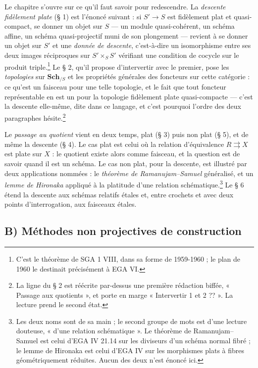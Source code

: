 \documentclass[11pt,a4paper]{article}
\begin{document}
Le chapitre s'ouvre sur ce qu'il faut savoir pour redescendre. La
\emph{descente fidèlement plate} (§ 1) est l'énoncé suivant : si $S' \to S$
est fidèlement plat et quasi-compact, se donner un objet sur $S$ — un
module quasi-cohérent, un schéma affine, un schéma quasi-projectif muni de
son plongement — revient à se donner un objet sur $S'$ et une \emph{donnée de
descente}, c'est-à-dire un isomorphisme entre ses deux images réciproques sur
$S' \times_S S'$ vérifiant une condition de cocycle sur le produit
triple.\footnote{C'est le théorème de SGA 1 VIII, dans sa forme de 1959-1960 ;
le plan de 1960 le destinait précisément à EGA VI.} Le § 2, qu'il propose
d'intervertir avec le premier, pose les \emph{topologies} sur
$\mathbf{Sch}_{/S}$ et les propriétés générales des foncteurs sur cette
catégorie : ce qu'est un faisceau pour une telle topologie, et le fait que
tout foncteur représentable en est un pour la topologie fidèlement plate
quasi-compacte — c'est la descente elle-même, dite dans ce langage, et c'est
pourquoi l'ordre des deux paragraphes hésite.\footnote{La ligne du § 2 est
réécrite par-dessus une première rédaction biffée, « Passage aux quotients »,
et porte en marge « Intervertir 1 et 2 ?? ». La lecture prend le second
état.}

Le \emph{passage au quotient} vient en deux temps, plat (§ 3) puis non plat
(§ 5), et de même la descente (§ 4). Le cas plat est celui où la relation
d'équivalence $R \rightrightarrows X$ est plate sur $X$ : le quotient existe
alors comme faisceau, et la question est de savoir quand il est un schéma.
Le cas non plat, pour la descente, est illustré par deux applications
nommées : le \emph{théorème de Ramanujam--Samuel} généralisé, et un
\emph{lemme de Hironaka} appliqué à la platitude d'une relation
schématique.\footnote{Les deux noms sont de sa main ; le second groupe de mots
est d'une lecture douteuse, « d'une relation schématique ». Le théorème de
Ramanujam--Samuel est celui d'EGA IV 21.14 sur les diviseurs d'un schéma
normal fibré ; le lemme de Hironaka est celui d'EGA IV sur les morphismes
plats à fibres géométriquement réduites. Aucun des deux n'est énoncé ici.}
Le § 6 étend la descente aux schémas relatifs étales et, entre crochets et
avec deux points d'interrogation, aux faisceaux étales.

\subsection*{B) Méthodes non projectives de construction}
\end{document}
